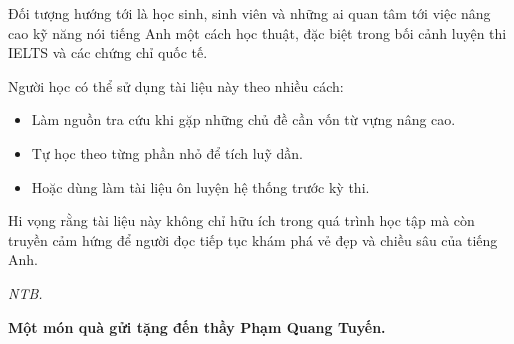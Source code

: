 \vspace{3mm}
\noindent
Đối tượng hướng tới là học sinh, sinh viên và những ai quan tâm tới việc 
nâng cao kỹ năng nói tiếng Anh một cách học thuật, đặc biệt trong bối cảnh 
luyện thi IELTS và các chứng chỉ quốc tế. 


\vspace{3mm}
\noindent
Người học có thể sử dụng tài liệu này theo nhiều cách: 

\begin{itemize}
    \item Làm nguồn tra cứu khi gặp những chủ đề cần vốn từ vựng nâng cao.
    \item Tự học theo từng phần nhỏ để tích luỹ dần.
    \item Hoặc dùng làm tài liệu ôn luyện hệ thống trước kỳ thi.
\end{itemize}


 

\vspace{3mm}
\noindent
Hi vọng rằng tài liệu này không chỉ hữu ích trong quá trình 
học tập mà còn truyền cảm hứng để người đọc tiếp tục khám phá vẻ đẹp 
và chiều sâu của tiếng Anh.

\begin{flushright}
    {\emph{NTB.}}
\end{flushright}

\vfill
\begin{center}
    \textbf{Một món quà gửi tặng đến thầy Phạm Quang Tuyến.}
\end{center}
\newpage

\clearpage
{
  \makeatletter
  \let\ps@plain\ps@empty
  \makeatother
  \pagestyle{empty}
  \tableofcontents
}
\clearpage